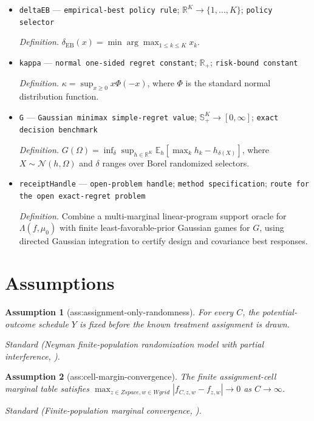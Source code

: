 \documentclass{article}
\newtheorem{assumption}{Assumption}
\begin{document}
\begin{itemize}
  \item \texttt{deltaEB} --- \texttt{empirical-\allowbreak{}best policy rule}; \(\mathbb R^K\to\{1,\ldots,K\}\); \texttt{policy selector}
  \par\smallskip\noindent\emph{Definition.} \(\delta_{\mathrm{EB}}(x)=\min\arg\max_{1\le k\le K}x_k\).
  \item \texttt{kappa} --- \texttt{normal one-\allowbreak{}sided regret constant}; \(\mathbb R_+\); \texttt{risk-\allowbreak{}bound constant}
  \par\smallskip\noindent\emph{Definition.} \(\kappa=\sup_{x\ge0}x\Phi(-x)\), where \(\Phi\) is the standard normal distribution function.
  \item \texttt{G} --- \texttt{Gaussian minimax simple-\allowbreak{}regret value}; \(\mathbb S_+^K\to[0,\infty]\); \texttt{exact decision benchmark}
  \par\smallskip\noindent\emph{Definition.} \(G(\Omega)=\inf_{\delta}\sup_{h\in\mathbb R^K}\mathbb E_h[\max_k h_k-h_{\delta(X)}]\), where \(X\sim\mathcal N(h,\Omega)\) and \(\delta\) ranges over Borel randomized selectors.
  \item \texttt{receiptHandle} --- \texttt{open-\allowbreak{}problem handle}; \texttt{method specification}; \texttt{route for the open exact-\allowbreak{}regret problem}
  \par\smallskip\noindent\emph{Definition.} Combine a multi-marginal linear-program support oracle for \(\Lambda(f,\mu_0)\) with finite least-favorable-prior Gaussian games for \(G\), using directed Gaussian integration to certify design and covariance best responses.
\end{itemize}

\section{Assumptions}

\begin{assumption}[ass:assignment-only-randomness]\label{ass:assignment-only-randomness}
For every \(C\), the potential-outcome schedule \(Y\) is fixed before the known treatment assignment is drawn.
\par\smallskip\noindent\emph{Standard} (Neyman finite-population randomization model with partial interference, \cite{LiDing2017}).
\end{assumption}

\begin{assumption}[ass:cell-margin-convergence]\label{ass:cell-margin-convergence}
The finite assignment-cell marginal table satisfies \(\max_{z\in Zspace,w\in Wgrid}|f_{C,z,w}-f_{z,w}|\to0\) as \(C\to\infty\).
\par\smallskip\noindent\emph{Standard} (Finite-population marginal convergence, \cite{AronowGreenLee2014}).
\end{assumption}
\end{document}
